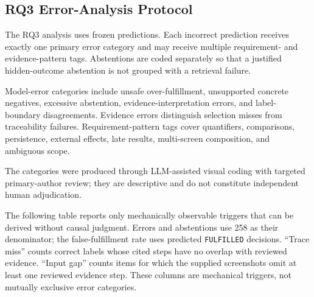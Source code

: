 \subsection{RQ3 Error-Analysis Protocol}\label{rq3-error-analysis-protocol}

The RQ3 analysis uses frozen predictions. Each incorrect prediction receives
exactly one primary error category and may receive multiple requirement- and
evidence-pattern tags. Abstentions are coded separately so that a justified
hidden-outcome abstention is not grouped with a retrieval failure.

Model-error categories include unsafe over-fulfillment, unsupported concrete
negatives, excessive abstention, evidence-interpretation errors, and
label-boundary disagreements. Evidence errors distinguish selection misses from
traceability failures. Requirement-pattern tags cover quantifiers, comparisons,
persistence, external effects, late results, multi-screen composition, and
ambiguous scope.

The categories were produced through LLM-assisted visual coding with targeted
primary-author review; they are descriptive and do not constitute independent
human adjudication.

The following table reports only mechanically observable triggers that can be
derived without causal judgment. Errors and abstentions use 258 as their
denominator; the false-fulfillment rate uses predicted \texttt{FULFILLED} decisions.
``Trace miss'' counts correct labels whose cited steps have no overlap with
reviewed evidence. ``Input gap'' counts items for which the supplied screenshots
omit at least one reviewed evidence step. These columns are mechanical triggers,
not mutually exclusive error categories.

